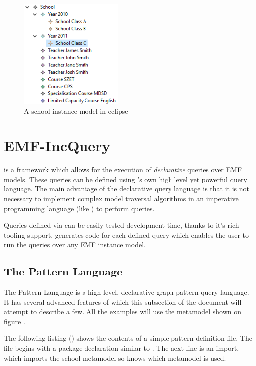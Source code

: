 \begin{figure}[!ht]
\centering
\includegraphics[width=50mm,keepaspectratio]{figures/InstanceModel_Eclipse.png}
\caption{A school instance model in eclipse}
\label{fig:InstanceModel_Eclipse}
\end{figure}

\section{EMF-IncQuery}\label{sec:EMF-IncQuery}

\emph{\EIQ{}} is a framework which allows for the execution of
\emph{declarative} queries over EMF models. These queries can be defined using
\EIQ{}'s own high level yet powerful query language. The main advantage of
the declarative query language is that it is not necessary to implement complex
model traversal algorithms in an imperative programming language (like \Java{})
to perform queries.

Queries defined via \EIQ{} can be easily tested development time, thanks to it's
rich tooling support. \EIQ{} generates \Java{} code for each
defined query which enables the user to run the queries over any EMF
instance model.

\subsection{The \EIQ{} Pattern Language}

The \EIQ Pattern Language is a high level, declarative graph pattern query
language. It has several advanced features of which this subsection of the
document will attempt to describe a few. All the examples will use the metamodel
shown on figure .

The following listing () shows the contents of a
simple \EIQ pattern definition file. The file begins with a package declaration
similar to \Java. The next line is an import, which imports the school metamodel
so \EIQ knows which metamodel is used.

